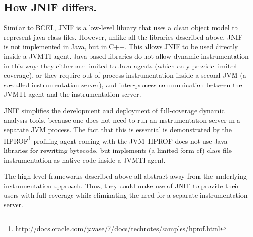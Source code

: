 \subsection*{How JNIF differs.}

Similar to BCEL, JNIF is a low-level library that uses a clean object model to represent java class files.
However, unlike all the libraries described above,
JNIF is not implemented in Java, but in C++.
This allows JNIF to be used directly inside a JVMTI agent. 
Java-based libraries do not allow dynamic instrumentation in this way:
they either are limited to Java agents (which only provide limited coverage),
or they require out-of-process instrumentation inside a second JVM (a so-called instrumentation server),
and inter-process communication between the JVMTI agent and the instrumentation server.

JNIF simplifies the development and deployment of full-coverage dynamic analysis tools,
because one does not need to run an instrumentation server in a separate JVM process.
The fact that this is essential is demonstrated by the HPROF\footnote{\url{http://docs.oracle.com/javase/7/docs/technotes/samples/hprof.html}} profiling agent coming with the JVM.
HPROF does not use Java libraries for rewriting bytecode,
but implements (a limited form of) class file instrumentation as native code inside a JVMTI agent.

The high-level frameworks described above all abstract away from the underlying instrumentation approach.
Thus, they could make use of JNIF to provide their users with full-coverage 
while eliminating the need for a separate instrumentation server.


